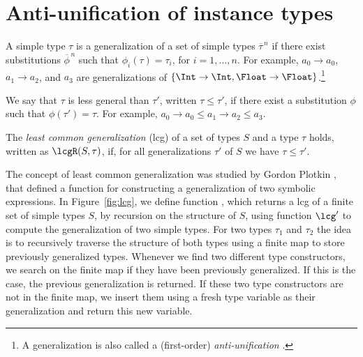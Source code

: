 \section{Anti-unification of instance types}
\label{sec:anti-unif}

A simple type $\tau$ is a generalization of a set of simple types
$\overline{\tau}^{\,n}$ if there exist substitutions
$\overline{\phi}^{\,n}$ such that $\phi_i(\tau)=\tau_i$, for
$i=1,\ldots,n$. For example, $a_0 \rightarrow a_0$,
$a_1 \rightarrow a_2$, and $a_3$ are generalizations of
$\{ \Int \rightarrow \Int, \Float \rightarrow \Float\}$.\footnote{A generalization is also called a (first-order) {\em
  anti-unification\/} \cite{ModelTheory2012}.}

We say that $\tau$ is less general than $\tau'$, written $\tau \leq
\tau'$, if there exist a substitution $\phi$ such that $\phi(\tau') = \tau$.  For
example, $a_0 \rightarrow a_0 \leq a_1 \rightarrow
a_2 \leq a_3$.

The {\it least common generalization} (lcg) of a set of types
$S$ and a type $\tau$ holds, written as $\lcgR(S,\tau)$, if, for all generalizations $\tau'$ of
$S$ we have $\tau \leq \tau'$.

The concept of least common generalization was studied by Gordon Plotkin \cite{plotkin1970note,plotkin1971further}, that defined a
function for constructing a generalization of two symbolic
expressions.  In Figure~\ref{fig:lcg}, we define function \lcg, which 
returns a lcg of a finite set of 
simple types $S$, by recursion on the structure of $S$,  
using function $\lcg'$ to compute the
generalization of two simple types. For two types $\tau_1$ and
$\tau_2$ the idea is to recursively traverse the structure of both
types using a finite map to store previously generalized
types. Whenever we find two different type constructors, we search on
the finite map if they have been previously generalized. If this is
the case, the previous generalization is returned. If these two type
constructors are not in the finite map, we insert them using a fresh
type variable as their generalization and return this new variable.

